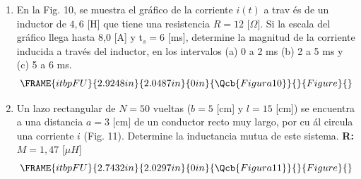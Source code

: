 \documentclass[12pt]{article}
\begin{document}
\begin{enumerate}
\item En la Fig. 10, se muestra el gr\'{a}fico de la corriente $i(t)$ a trav%
\'{e}s de un inductor de $4,6$ [H] que tiene una resistencia $R=12$ [$\Omega 
$]. Si la escala del gr\'{a}fico llega hasta 8,0 [A] y t$_{s}=6$ [ms],
determine la magnitud de la corriente inducida a trav\'{e}s del inductor, en
los intervalos (a) 0 a 2 ms (b) 2 a 5 ms y (c) 5 a 6 ms.%
\begin{equation*}
\FRAME{itbpFU}{2.9248in}{2.0487in}{0in}{\Qcb{Figura 10}}{}{Figure}{\special%
{language "Scientific Word";type "GRAPHIC";maintain-aspect-ratio
TRUE;display "USEDEF";valid_file "T";width 2.9248in;height 2.0487in;depth
0in;original-width 7.504in;original-height 5.2442in;cropleft "0";croptop
"1";cropright "1";cropbottom "0";tempfilename
'R45SAH0F.wmf';tempfile-properties "XPR";}}
\end{equation*}

\item Un lazo rectangular de $N=50$ vueltas ($b=5$ [cm] y $l=15$ [cm]) se
encuentra a una distancia $a=3$ [cm] de un conductor recto muy largo, por cu%
\'{a}l circula una corriente $i$ (Fig. 11). Determine la inductancia mutua
de este sistema. \textbf{R: }$M=1,47$ [$\mu H$]%
\begin{equation*}
\FRAME{itbpFU}{2.7432in}{2.0297in}{0in}{\Qcb{Figura 11}}{}{Figure}{\special%
{language "Scientific Word";type "GRAPHIC";maintain-aspect-ratio
TRUE;display "USEDEF";valid_file "T";width 2.7432in;height 2.0297in;depth
0in;original-width 5.2088in;original-height 3.8475in;cropleft "0";croptop
"1";cropright "1";cropbottom "0";tempfilename
'R45S8S0E.wmf';tempfile-properties "XPR";}}
\end{equation*}
\end{enumerate}
\end{document}
